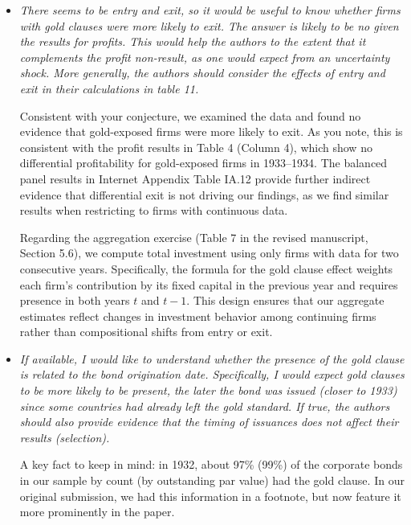 \begin{itemize}
    \item[\textit{\textcolor{red!60!black}{b.}}] \textit{\textcolor{red!60!black}{
    There seems to be entry and exit, so it would be useful to know whether firms with gold clauses were more likely to exit. The answer is likely to be no given the results for profits. This would help the authors to the extent that it complements the profit non-result, as one would expect from an uncertainty shock. More generally, the authors should consider the effects of entry and exit in their calculations in table 11.
    }}

    \bigskip

    \noindent Consistent with your conjecture, we examined the data and found no evidence that gold-exposed firms were more likely to exit. As you note, this is consistent with the profit results in Table 4 (Column 4), which show no differential profitability for gold-exposed firms in 1933--1934. The balanced panel results in Internet Appendix Table IA.12 provide further indirect evidence that differential exit is not driving our findings, as we find similar results when restricting to firms with continuous data.
    
    Regarding the aggregation exercise (Table 7 in the revised manuscript, Section 5.6), we compute total investment using only firms with data for two consecutive years. Specifically, the formula for the gold clause effect weights each firm's contribution by its fixed capital in the previous year and requires presence in both years $t$ and $t-1$. This design ensures that our aggregate estimates reflect changes in investment behavior among continuing firms rather than compositional shifts from entry or exit.
    
    \item[\textit{\textcolor{red!60!black}{c.}}] \textit{\textcolor{red!60!black}{
    If available, I would like to understand whether the presence of the gold clause is related to the bond origination date. Specifically, I would expect gold clauses to be more likely to be present, the later the bond was issued (closer to 1933) since some countries had already left the gold standard. If true, the authors should also provide evidence that the timing of issuances does not affect their results (selection).
    }}

    \bigskip

    \noindent A key fact to keep in mind: in 1932, about 97\% (99\%) of the corporate bonds in our sample by count (by outstanding par value) had the gold clause. In our original submission, we had this information in a footnote, but now feature it more prominently in the paper. 
    

\end{itemize}
